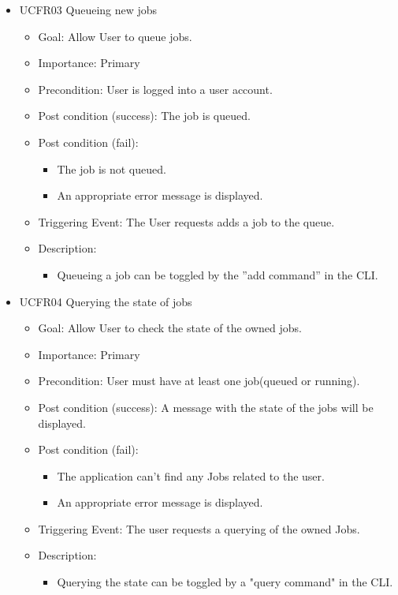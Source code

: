 \begin{itemize}
    \item UCFR03 Queueing new jobs
    \begin{itemize}
      \item Goal: Allow User to queue jobs.
      \item Importance: Primary
      \item Precondition: User is logged into a user account.
      \item Post condition (success): The job is queued.
      \item Post condition (fail):
      \begin{itemize}
        \item The job is not queued.
        \item An appropriate error message is displayed.
      \end{itemize}
      \item Triggering Event: The User requests adds a job to the queue.
      \item Description:
      \begin{itemize}
        \item  Queueing a job can be toggled by the ”add command” in the CLI.
      \end{itemize}
    \end{itemize}
    
    \item UCFR04 Querying the state of jobs
    \begin{itemize}
      \item Goal: Allow User to check the state of the owned jobs.
      \item Importance: Primary
      \item Precondition: User must have at least one job(queued or running).
      \item Post condition (success): A message with the state of the jobs will be displayed.
      \item Post condition (fail):
      \begin{itemize}
        \item The application can't find any Jobs related to the user.
        \item An appropriate error message is displayed.
      \end{itemize}
      \item Triggering Event: The user requests a querying of the owned Jobs.
      \item Description:
      \begin{itemize}
        \item Querying the state can be toggled by a "query command" in the CLI.
      \end{itemize}
    \end{itemize}
    

\end{itemize}
